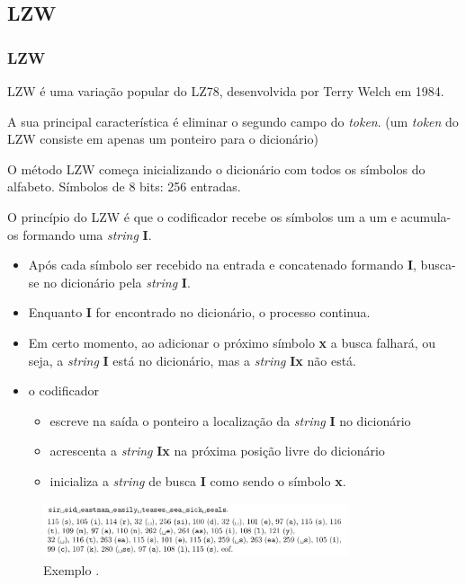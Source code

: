 \subsection{LZW}
\begin{frame}[allowframebreaks]
  \frametitle{LZW}
  
  \vspace{2ex} 

  LZW é uma variação popular do LZ78, desenvolvida por Terry Welch em 1984. 
  
  \vspace{2ex}
  A sua principal característica é eliminar o segundo campo do \textit{token}.
  (um \textit{token} do LZW consiste em apenas um ponteiro para o dicionário)

  \vspace{2ex}
  O método LZW começa inicializando o dicionário com todos os símbolos do alfabeto.
  Símbolos de 8 bits: 256 entradas.

  \framebreak

  O princípio do LZW é que o codificador recebe os símbolos um a um e acumula-os formando uma \textit{string} \textbf{I}.
  \begin{itemize}
  \item Após cada símbolo ser recebido na entrada e concatenado formando \textbf{I},
        busca-se no dicionário pela \textit{string} \textbf{I}.
  \item Enquanto \textbf{I} for encontrado no dicionário, o processo continua.
  \item Em certo momento, ao adicionar o próximo símbolo \textbf{x} a busca falhará, ou seja,
        a \textit{string} \textbf{I} está no dicionário, mas a \textit{string} \textbf{Ix} não está.
  \item o codificador 
    \begin{itemize}
    \item escreve na saída o ponteiro a localização da \textit{string} \textbf{I} no dicionário 
    \item acrescenta a \textit{string} \textbf{Ix} na próxima posição livre do dicionário
    \item inicializa a \textit{string} de busca \textbf{I} como sendo o símbolo \textbf{x}. 
    \end{itemize}
  \end{itemize}  

  \framebreak

  \begin{figure}[h!]
  \centering
  \includegraphics[width=0.8\textwidth]{images/lzw_example.png}
  \caption{Exemplo \citep{salomon2007}.}
  \label{fig:lzw_example}
  \end{figure}


\end{frame}
